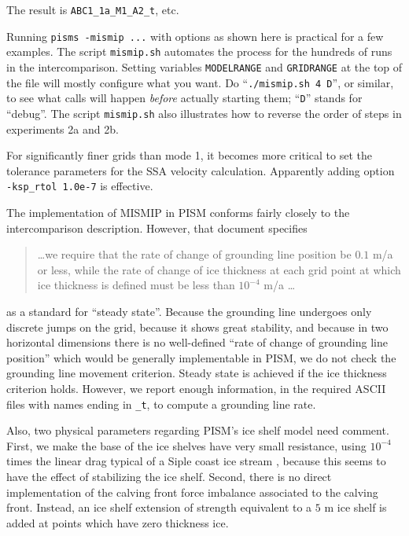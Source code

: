 \noindent The result is \texttt{ABC1_1a_M1_A2_t}, etc.

Running \texttt{pisms -mismip ...} with options as shown here is practical for a few examples.  The script \texttt{mismip.sh} automates the process for the hundreds of runs in the intercomparison.  Setting variables \texttt{MODELRANGE} and \texttt{GRIDRANGE} at the top of the file will mostly configure what you want.  Do ``\texttt{./mismip.sh 4 D}'', or similar, to see what calls will happen \emph{before} actually starting them; ``\texttt{D}'' stands for ``debug''.  The script \texttt{mismip.sh} also illustrates how to reverse the order of steps in experiments 2a and 2b.

For significantly finer grids than mode 1, it becomes more critical to set the tolerance parameters for the SSA velocity calculation.  Apparently adding option \texttt{-ksp_rtol 1.0e-7} is effective.

The implementation of MISMIP in PISM conforms fairly closely to the intercomparison description.  However, that document specifies
\begin{quotation}
\dots we require that the rate of change of grounding line position be $0.1$ m/a or less, while the rate of change of ice thickness at each grid point at which ice thickness is defined must be less than $10^{-4}$ m/a \dots
\end{quotation}
as a standard for ``steady state''.  Because the grounding line undergoes only discrete jumps on the grid, because it shows great stability, and because in two horizontal dimensions there is no well-defined ``rate of change of grounding line position'' which would be generally implementable in PISM, we do not check the grounding line movement criterion.  Steady state is achieved if the ice thickness criterion holds.  However, we report enough information, in the required ASCII files with names ending in \texttt{_t}, to compute a grounding line rate.

Also, two physical parameters regarding PISM's ice shelf model need comment.  First, we make the base of the ice shelves have very small resistance, using $10^{-4}$ times the linear drag typical of a Siple coast ice stream \cite{HulbeMacAyeal}, because this seems to have the effect of stabilizing the ice shelf.  Second, there is no direct implementation of the calving front force imbalance associated to the calving front.  Instead, an ice shelf extension of strength equivalent to a $5$ m ice shelf is added at points which have zero thickness ice.


